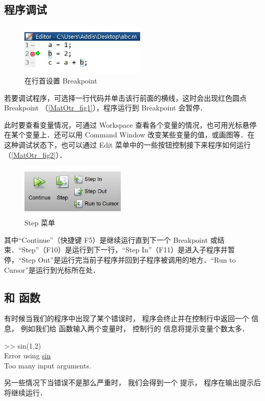 

\subsection{程序调试}
\begin{figure}[ht]
\centering
\includegraphics[width= 6cm]{./figures/MatOtr1.pdf}
\caption{在行首设置 Breakpoint}\label{MatOtr_fig1}
\end{figure}

若要调试程序，可选择一行代码并单击该行前面的横线，这时会出现红色圆点 Breakpoint （\autoref{MatOtr_fig1}），程序运行到 Breakpoint 会暂停．

此时要查看变量情况，可通过 Workspace 查看各个变量的情况，也可用光标悬停在某个变量上．还可以用 Command Window 改变某些变量的值，或画图等．在这种调试状态下，也可以通过 Edit 菜单中的一些按钮控制接下来程序如何运行（\autoref{MatOtr_fig2}）．
\begin{figure}[ht]
\centering
\includegraphics[width= 5cm]{./figures/MatOtr2.pdf}
\caption{Step 菜单}\label{MatOtr_fig2}
\end{figure}
其中“Continue”（快捷键 F5）是继续运行直到下一个 Breakpoint 或结束．“Step”（F10）是运行到下一行，“Step In”（F11）是进入子程序并暂停，“Step Out”是运行完当前子程序并回到子程序被调用的地方．“Run to Cursor”是运行到光标所在处．

\subsection{ 和  函数}
有时候当我们的程序中出现了某个错误时， 程序会终止并在控制行中返回一个  信息， 例如我们给  函数输入两个变量时， 控制行的  信息将提示变量个数太多．
\begin{Command}
>> sin(1,2)\\
{\color{error}Error using \underline{sin}\\
Too many input arguments.}
\end{Command}
另一些情况下当错误不是那么严重时， 我们会得到一个  提示， 程序在输出提示后将继续运行．

